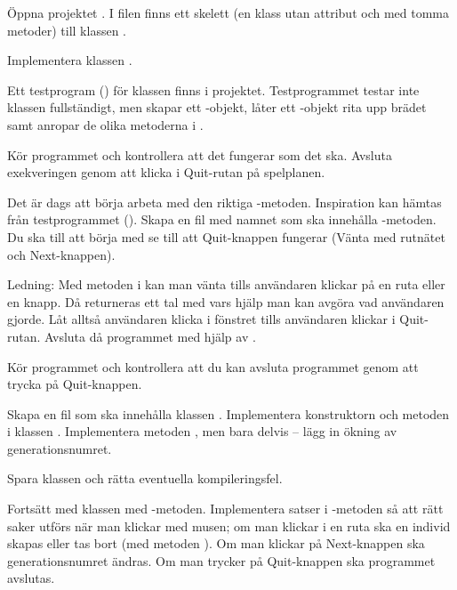 \begin{Datorarbete}
\item Öppna projektet . I filen  finns ett skelett (en klass utan attribut
och med tomma metoder) till klassen .

Implementera klassen .

\item Ett testprogram () för klassen  finns i projektet.
Testprogrammet testar inte klassen fullständigt, men skapar ett -objekt, låter ett -objekt rita upp brädet samt anropar de olika metoderna i .

Kör programmet och kontrollera att det fungerar som det ska. Avsluta exekveringen genom att klicka i Quit-rutan på spelplanen.

\item Det är dags att börja arbeta med den riktiga -metoden. Inspiration kan hämtas från testprogrammet (). Skapa en fil med namnet  som ska innehålla -metoden. Du ska till att börja med se till att Quit-knappen fungerar (Vänta med rutnätet och Next-knappen).

Ledning: Med metoden  i  kan man vänta tills användaren klickar på en ruta eller en knapp. Då returneras ett tal med vars hjälp man kan avgöra vad användaren gjorde. Låt alltså användaren klicka i fönstret tills användaren klickar i Quit-rutan. Avsluta då programmet med hjälp av .

Kör programmet och kontrollera att du kan avsluta programmet genom att trycka på Quit-knappen.

\item Skapa en fil  som ska innehålla klassen . Implementera konstruktorn och metoden  i klassen . Implementera metoden , men bara delvis -- lägg in ökning av generationsnumret.

Spara klassen  och rätta eventuella kompileringsfel.

\item Fortsätt med klassen med -metoden. Implementera satser i -metoden så att rätt saker utförs när man klickar med musen; om man klickar i en ruta ska en individ skapas eller tas bort (med metoden ). Om man klickar på Next-knappen ska generationsnumret ändras. Om man trycker på Quit-knappen ska programmet avslutas.


\end{Datorarbete}
